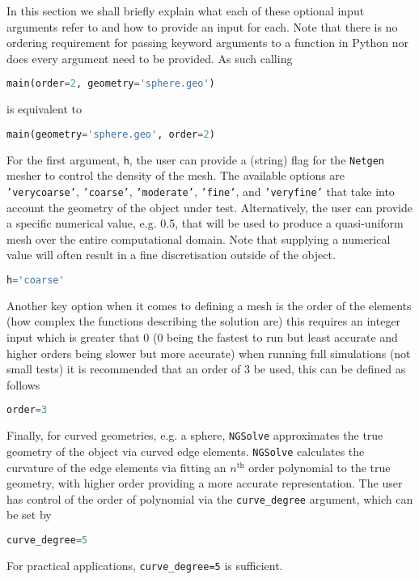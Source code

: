 \noindent
In this section we shall briefly explain what each of these optional input arguments refer to and how to provide an input for each. Note that there is no ordering requirement for passing keyword arguments to a function in Python nor does every argument need to be provided. As such calling
\begin{lstlisting}[language=Python]
main(order=2, geometry='sphere.geo')
\end{lstlisting}
\noindent
is equivalent to 
\begin{lstlisting}[language=Python]
main(geometry='sphere.geo', order=2)
\end{lstlisting}
\noindent
For the first argument, \texttt{h}, the user can provide a (string) flag for the \texttt{Netgen} mesher to control the density of the mesh. The available options are \texttt{'verycoarse'}, \texttt{'coarse'}, \texttt{'moderate'}, \texttt{'fine'}, and \texttt{'veryfine'} that take into account the geometry of the object under test. Alternatively, the user can provide a specific numerical value, e.g. 0.5, that will be used to produce a quasi-uniform mesh over the entire computational domain. Note that supplying a numerical value will often result in a fine discretisation outside of the object.

\begin{lstlisting}[language=Python]
h='coarse'
\end{lstlisting}
\noindent
Another key option when it comes to defining a mesh is the order of the elements (how complex the functions describing the solution are) this requires an integer input which is greater that 0 (0 being the fastest to run but least accurate and higher orders being slower but more accurate) when running full simulations (not small tests) it is recommended that an order of 3 be used, this can be defined as follows\\
\begin{lstlisting}[language=Python]
order=3
\end{lstlisting}
\noindent
Finally, for curved geometries, e.g. a sphere, \texttt{NGSolve} approximates the true geometry of the object via curved edge elements. \texttt{NGSolve} calculates the curvature of the edge elements via fitting an $n^{\mathrm{th}}$ order polynomial to the true geometry, with higher order providing a more accurate representation. The user has control of the order of polynomial via the \texttt{curve\_degree} argument, which can be set by\\
\begin{lstlisting}[language=Python]
curve_degree=5
\end{lstlisting}
\noindent
For practical applications, \texttt{curve\_degree=5} is sufficient.

